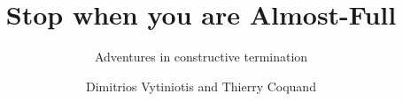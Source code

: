 \documentclass{llncs}
\begin{document}


\title{Stop when you are Almost-Full}
\subtitle{Adventures in constructive termination}

\author{Dimitrios Vytiniotis and Thierry Coquand}

\maketitle
\end{document}
